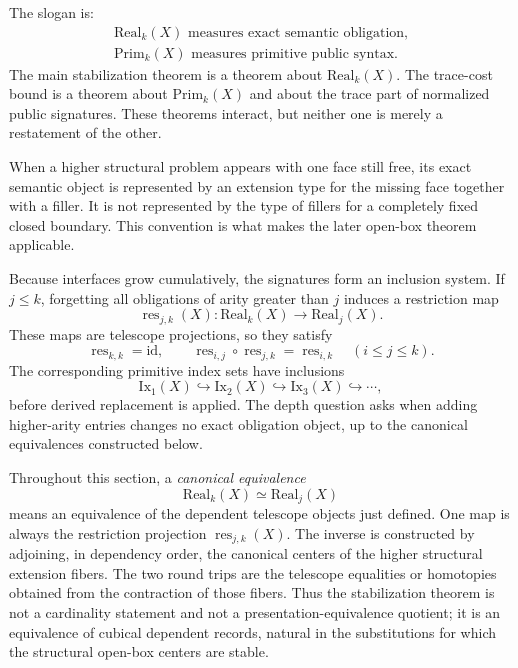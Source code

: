 \documentclass{lmcs}
\newcommand{\res}{\operatorname{res}}
\begin{document}
The slogan is:
\[
  \begin{gathered}
  \mathrm{Real}_k(X) \text{ measures exact semantic obligation,}\\
  \mathrm{Prim}_k(X) \text{ measures primitive public syntax.}
  \end{gathered}
\]
The main stabilization theorem is a theorem about \(\mathrm{Real}_k(X)\).  The trace-cost
bound is a theorem about \(\mathrm{Prim}_k(X)\) and about the trace part of normalized public
signatures.  These theorems interact, but neither one is merely a restatement of the other.

When a higher structural problem appears with one face still free, its exact semantic object
is represented by an extension type for the missing face together with a filler.  It is not
represented by the type of fillers for a completely fixed closed boundary.  This convention is
what makes the later open-box theorem applicable.

Because interfaces grow cumulatively, the signatures form an inclusion system.  If \(j\leq k\),
forgetting all obligations of arity greater than \(j\) induces a restriction map
\[
  \res_{j,k}(X):\mathrm{Real}_k(X)\longrightarrow \mathrm{Real}_j(X).
\]
These maps are telescope projections, so they satisfy
\[
  \res_{k,k}=\mathrm{id},
  \qquad
  \res_{i,j}\circ\res_{j,k}=\res_{i,k}
  \quad (i\leq j\leq k).
\]
The corresponding primitive index sets have inclusions
\[
  \mathrm{Ix}_1(X)\hookrightarrow \mathrm{Ix}_2(X)\hookrightarrow
  \mathrm{Ix}_3(X)\hookrightarrow\cdots,
\]
before derived replacement is applied.  The depth question asks when adding higher-arity
entries changes no exact obligation object, up to the canonical equivalences constructed
below.

Throughout this section, a \emph{canonical equivalence}
\[
  \mathrm{Real}_k(X)\simeq \mathrm{Real}_j(X)
\]
means an equivalence of the dependent telescope objects just defined.  One map is always the
restriction projection \(\res_{j,k}(X)\).  The inverse is constructed by adjoining, in
dependency order, the canonical centers of the higher structural extension fibers.  The two
round trips are the telescope equalities or homotopies obtained from the contraction of those
fibers.  Thus the stabilization theorem is not a cardinality statement and not a
presentation-equivalence quotient; it is an equivalence of cubical dependent records, natural
in the substitutions for which the structural open-box centers are stable.
\end{document}
